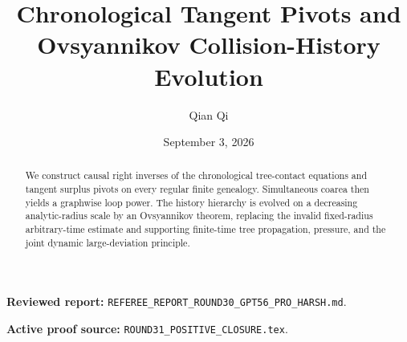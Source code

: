 \documentclass[11pt,reqno]{amsart}
\title[B2 Round 31 revision]{Chronological Tangent Pivots and Ovsyannikov Collision-History Evolution}
\author{Qian Qi}
\date{September 3, 2026}
\begin{document}
\begin{abstract}
We construct causal right inverses of the chronological tree-contact equations and tangent surplus pivots on every regular finite genealogy.  Simultaneous coarea then yields a graphwise loop power.  The history hierarchy is evolved on a decreasing analytic-radius scale by an Ovsyannikov theorem, replacing the invalid fixed-radius arbitrary-time estimate and supporting finite-time tree propagation, pressure, and the joint dynamic large-deviation principle.
\end{abstract}
\maketitle
\noindent\textbf{Reviewed report:} \texttt{REFEREE\_REPORT\_ROUND30\_GPT56\_PRO\_HARSH.md}.\par
\noindent\textbf{Active proof source:} \texttt{ROUND31\_POSITIVE\_CLOSURE.tex}.\par

\end{document}
